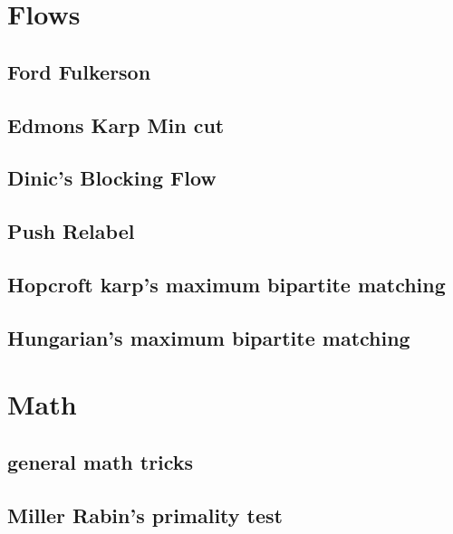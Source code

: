 \section{Flows}
\subsection{Ford Fulkerson}
\raggedbottom
\hrulefill
\subsection{Edmons Karp Min cut}
\raggedbottom
\hrulefill
\subsection{Dinic's Blocking Flow}
\raggedbottom
\hrulefill
\subsection{Push Relabel}
\raggedbottom
\hrulefill
\subsection{Hopcroft karp's maximum bipartite matching}
\raggedbottom
\hrulefill
\subsection{Hungarian's maximum bipartite matching}
\raggedbottom
\hrulefill

\section{Math}
\subsection{general math tricks}
\raggedbottom
\hrulefill
\subsection{Miller Rabin's primality test}
\raggedbottom
\hrulefill
